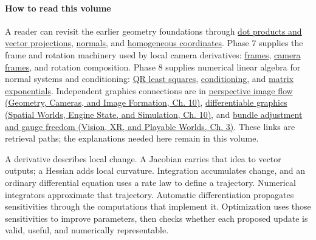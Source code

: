 \paragraph{How to read this volume}\label{01-foundations-i-ch020-how-to-read-this-volume}

A reader can revisit the earlier geometry foundations through \hyperref[01-foundations-i-ch017-the-dot-product-turns-two-movements-into-a-measurement]{dot products and vector projections}, \hyperref[01-foundations-i-ch018-a-normal-is-a-measuring-rule-before-it-is-an-arrow]{normals}, and \hyperref[01-foundations-i-ch018-homogeneous-coordinates-preserve-the-role-of-a-location]{homogeneous coordinates}. Phase 7 supplies the frame and rotation machinery used by local camera derivatives: \hyperref[01-foundations-i-ch018-a-frame-combines-directions-with-a-place-to-stand]{frames}, \hyperref[01-foundations-i-ch019-a-camera-is-another-frame-so-viewing-uses-its-inverse]{camera frames}, and {rotation composition}. Phase 8 supplies numerical linear algebra for normal systems and conditioning: \hyperref[01-foundations-i-ch020-qr-turns-least-squares-into-a-triangular-solve-plus-an-irreducible-residual]{QR least squares}, \hyperref[02-foundations-ii-ch024-conditioning-weak-singular-directions-amplify-uncertainty]{conditioning}, and \hyperref[02-foundations-ii-ch026-the-exponential-solves-a-linear-differential-equation]{matrix exponentials}. Independent graphics connections are in \href{../03-Geometry-Cameras-and-Image-Formation/main.pdf\#nameddest=03-visual-computing-i-ch003-perspective-projection-links-3-d-velocity-to-image-flow}{perspective image flow (Geometry, Cameras, and Image Formation, Ch. 10)}, \href{../05-Spatial-Worlds-Engine-State-and-Simulation/main.pdf\#nameddest=04-visual-computing-ii-ch029-differentiating-through-a-graphics-pipeline}{differentiable graphics (Spatial Worlds, Engine State, and Simulation, Ch. 10)}, and \href{../07-Vision-XR-and-Playable-Worlds/main.pdf\#nameddest=04-visual-computing-ii-ch032-bundle-adjustment-objective-and-gauge}{bundle adjustment and gauge freedom (Vision, XR, and Playable Worlds, Ch. 3)}. These links are retrieval paths; the explanations needed here remain in this volume.

A derivative describes local change. A Jacobian carries that idea to vector outputs; a Hessian adds local curvature. Integration accumulates change, and an ordinary differential equation uses a rate law to define a trajectory. Numerical integrators approximate that trajectory. Automatic differentiation propagates sensitivities through the computations that implement it. Optimization uses those sensitivities to improve parameters, then checks whether each proposed update is valid, useful, and numerically representable.

